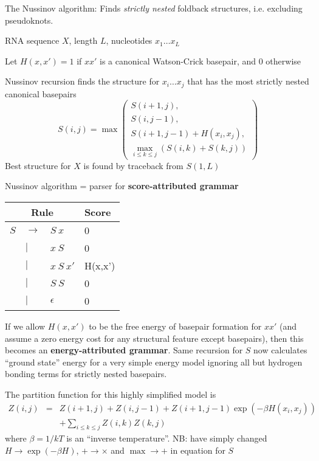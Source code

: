 \documentclass{beamer}
\begin{document}
\begin{frame}{}
\itemb
\item The Nussinov algorithm: Finds {\em strictly nested} foldback structures, i.e. excluding pseudoknots.
 \itemb
 \item RNA sequence $X$, length $L$, nucleotides $x_1 \ldots x_L$
 \item Let $H(x,x')=1$ if $xx'$ is a canonical Watson-Crick basepair, and $0$ otherwise
 \item Nussinov recursion finds the structure for $x_i \ldots x_j$ that has the most strictly nested canonical basepairs
\[
S(i,j) = \max \left( \begin{array}{c} S(i+1,j), \\ S(i,j-1), \\ S(i+1,j-1) + H(x_i,x_j), \\ \max_{i \leq k \leq j} (S(i,k) + S(k,j)) \end{array} \right)
\]
Best structure for $X$ is found by traceback from $S(1,L)$
 \iteme
\iteme
\end{frame}

\begin{frame}{}
Nussinov algorithm = parser for {\bf score-attributed grammar}

\begin{tabular}{rll|l}
\multicolumn{3}{c|}{Rule} & Score \\
\hline
$S$ & $\to$ & $S\ x$     & 0 \\
    &   $|$ & $x\ S$     & 0 \\
    &   $|$ & $x\ S\ x'$ & H(x,x') \\
    &   $|$ & $S\ S$     & 0 \\
    &   $|$ & $\epsilon$ & 0
\end{tabular}

If we allow $H(x,x')$ to be the free energy of basepair formation for $xx'$
(and assume a zero energy cost for any structural feature except basepairs),
then this becomes an {\bf energy-attributed grammar}.
Same recursion for $S$ now calculates ``ground state'' energy
for a very simple energy model ignoring all but hydrogen bonding terms for strictly nested basepairs.
\end{frame}

\begin{frame}{}
The partition function for this highly simplified model is
\begin{eqnarray*}
Z(i,j) & = & Z(i+1,j) + Z(i,j-1) + Z(i+1,j-1) \exp (-\beta H(x_i,x_j)) \\
& & + \sum_{i \leq k \leq j} Z(i,k) Z(k,j)
\end{eqnarray*}
where $\beta = 1/kT$ is an ``inverse temperature''.
NB: have simply changed $H \to \exp(-\beta H)$, $+ \to \times$ and $\max \to +$ in equation for $S$
\end{frame}
\end{document}
